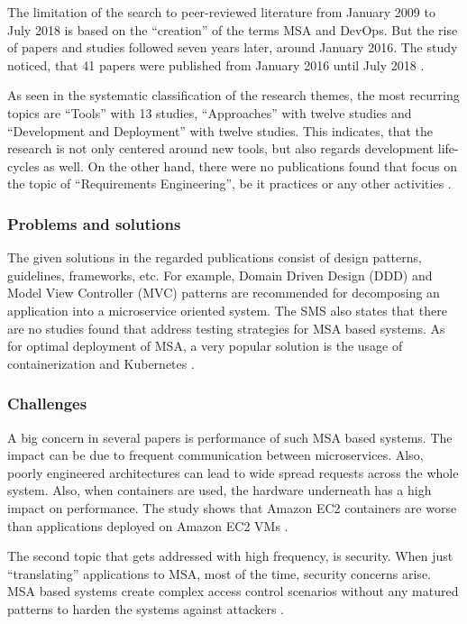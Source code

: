 The limitation of the search to peer-reviewed literature from January 2009 to
July 2018 is based on the ``creation'' of the terms MSA and DevOps.
But the rise of papers and studies followed seven years later, around January 2016.
The study noticed, that 41 papers were published from January 2016 until July 2018
\cite{waseem:SMSMSADevOps}.

As seen in the systematic classification of the research themes, the most recurring
topics are ``Tools'' with 13 studies, ``Approaches'' with twelve studies and
``Development and Deployment'' with twelve studies. This indicates, that the research
is not only centered around new tools, but also regards development life-cycles
as well. On the other hand, there were no publications found that focus on
the topic of ``Requirements Engineering'', be it practices or any other
activities \cite{waseem:SMSMSADevOps}.

\subsubsection{Problems and solutions}

The given solutions in the regarded publications consist of
design patterns, guidelines, frameworks, etc. For example,
Domain Driven Design (DDD) and Model View Controller (MVC) patterns
are recommended for decomposing an application into a microservice oriented
system. The SMS also states that there are no studies found that
address testing strategies for MSA based systems. As for optimal deployment
of MSA, a very popular solution is the usage of containerization and Kubernetes
\cite{waseem:SMSMSADevOps}.

\subsubsection{Challenges}

A big concern in several papers is performance of such MSA based systems.
The impact can be due to frequent communication between microservices.
Also, poorly engineered architectures can lead to wide spread requests
across the whole system. Also, when containers are used, the hardware underneath
has a high impact on performance. The study shows that Amazon EC2 containers are
worse than applications deployed on Amazon EC2 VMs \cite{waseem:SMSMSADevOps}.

The second topic that gets addressed with high frequency, is security. When just ``translating''
applications to MSA, most of the time, security concerns arise. MSA based systems
create complex access control scenarios without any matured patterns to harden
the systems against attackers \cite{waseem:SMSMSADevOps}.

